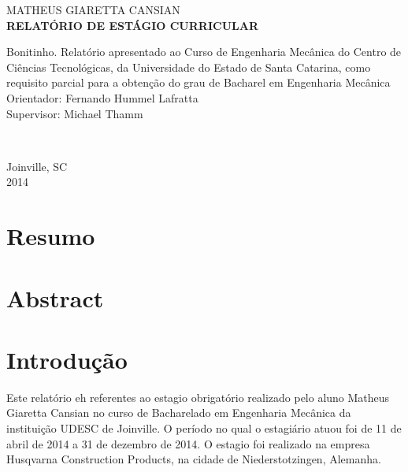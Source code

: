 \documentclass[12pt]{article}
\begin{document}
	\begin{titlepage}
		\begin{center}
			{\fontsize{16pt}{\baselineskip}\fontfamily{\familydefault}\selectfont MATHEUS GIARETTA CANSIAN}\\[6cm]
			{\fontsize{18pt}{\baselineskip}\fontfamily{\familydefault}\selectfont \bf RELATÓRIO DE ESTÁGIO CURRICULAR}\\[5.5cm]
		\end{center}
		
		{
			\fontsize{14pt}{\baselineskip} \fontfamily{\familydefault} \selectfont
			
			\hspace{.45\textwidth} \begin{minipage}{.5\textwidth}
				\noindent 
				Bonitinho. Relatório apresentado ao Curso de Engenharia Mecânica do Centro de Ciências Tecnológicas, 
				da Universidade do Estado de Santa Catarina, 
				como requisito parcial para a obtenção do grau de Bacharel em Engenharia Mecânica\\[0.6cm]
				Orientador: Fernando Hummel Lafratta\\[0.1cm]
				Supervisor: Michael Thamm
			\end{minipage}
		}\\[2.5cm]
		
		
		\begin{center}
		{
			\fontsize{14pt}{\baselineskip} \fontfamily{\familydefault} \selectfont
			Joinville, SC\\[0.2cm]
			2014
		}
		\end{center}
	\end{titlepage}

\onehalfspacing

\tableofcontents
\pagebreak

\listoffigures
\pagebreak

\section{Resumo}
\pagebreak

\section{Abstract}
\pagebreak


\section{Introdução}
	Este relatório eh referentes ao estagio obrigatório realizado pelo aluno Matheus Giaretta Cansian no curso de Bacharelado em Engenharia Mecânica da instituição UDESC de Joinville.
	O período no qual o estagiário atuou foi de 11 de abril de 2014 a 31 de dezembro de 2014. O estagio foi realizado na empresa Husqvarna Construction Products, na cidade de Niederstotzingen, Alemanha.
\pagebreak
\end{document}
